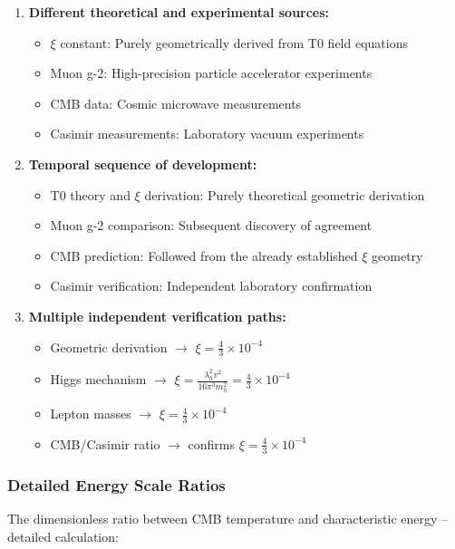 	\begin{enumerate}
		\item \textbf{Different theoretical and experimental sources:}
		\begin{itemize}
			\item $\xi$ constant: Purely geometrically derived from T0 field equations
			\item Muon g-2: High-precision particle accelerator experiments
			\item CMB data: Cosmic microwave measurements
			\item Casimir measurements: Laboratory vacuum experiments
		\end{itemize}
		
		\item \textbf{Temporal sequence of development:}
		\begin{itemize}
			\item T0 theory and $\xi$ derivation: Purely theoretical geometric derivation
			\item Muon g-2 comparison: Subsequent discovery of agreement
			\item CMB prediction: Followed from the already established $\xi$ geometry
			\item Casimir verification: Independent laboratory confirmation
		\end{itemize}
		
		\item \textbf{Multiple independent verification paths:}
		\begin{itemize}
			\item Geometric derivation $\to$ $\xi = \frac{4}{3} \times 10^{-4}$
			\item Higgs mechanism $\to$ $\xi = \frac{\lambda_h^2 v^2}{16\pi^3 m_h^2} = \frac{4}{3} \times 10^{-4}$
			\item Lepton masses $\to$ $\xi = \frac{4}{3} \times 10^{-4}$
			\item CMB/Casimir ratio $\to$ confirms $\xi = \frac{4}{3} \times 10^{-4}$
		\end{itemize}
	\end{enumerate}
	
	\subsubsection{Detailed Energy Scale Ratios}
	
	The dimensionless ratio between CMB temperature and characteristic energy -- detailed calculation:
	
